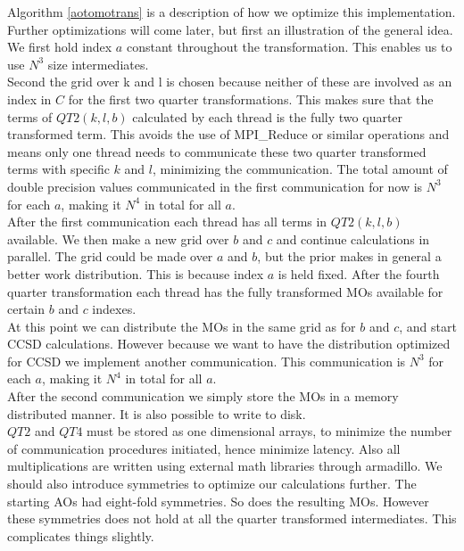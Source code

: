 \documentclass[a4paper,norsk,11pt,twoside]{report}
\begin{document}
Algorithm \ref{aotomotrans} is a description of how we optimize this implementation. Further optimizations will come later, but first an illustration of the general idea. We first hold index $a$ constant throughout the transformation. This enables us to use $N^3$ size intermediates. \\

Second the grid over k and l is chosen because neither of these are involved as an index in $C$ for the first two quarter transformations. This makes sure that the terms of $QT2(k,l,b)$ calculated by each thread is the fully two quarter transformed term. This avoids the use of MPI\_Reduce or similar operations and means only one thread needs to communicate these two quarter transformed terms with specific $k$ and $l$, minimizing the communication. The total amount of double precision values communicated in the first communication for now is $N^3$ for each $a$, making it $N^4$ in total for all $a$. \\

After the first communication each thread has all terms in $QT2(k,l,b)$ available. We then make a new grid over $b$ and $c$ and continue calculations in parallel. The grid could be made over $a$ and $b$, but the prior makes in general a better work distribution. This is because index $a$ is held fixed. After the fourth quarter transformation each thread has the fully transformed MOs available for certain $b$ and $c$ indexes. \\

At this point we can distribute the MOs in the same grid as for $b$ and $c$, and start CCSD calculations. However because we want to have the distribution optimized for CCSD we implement another communication. This communication is $N^3$ for each $a$, making it $N^4$ in total for all $a$. \\

After the second communication we simply store the MOs in a memory distributed manner. It is also possible to write to disk. \\

$QT2$ and $QT4$ must be stored as one dimensional arrays, to minimize the number of communication procedures initiated, hence minimize latency. Also all multiplications are written using external math libraries through armadillo. We should also introduce symmetries to optimize our calculations further. The starting AOs had eight-fold symmetries. So does the resulting MOs. However these symmetries does not hold at all the quarter transformed intermediates. This complicates things slightly. \\
\end{document}
